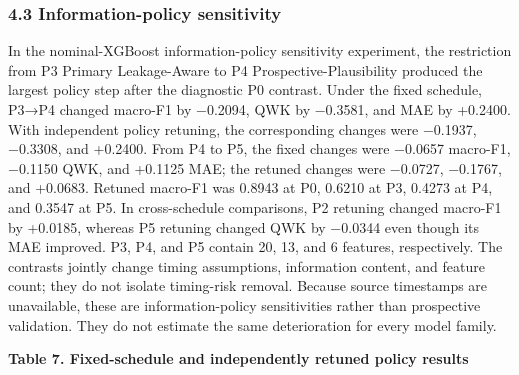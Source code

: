 \documentclass[
  a4paper,
  review]{elsarticle}
\begin{document}
\subsubsection{4.3 Information-policy
sensitivity}\label{information-policy-sensitivity}

In the nominal-XGBoost information-policy sensitivity experiment, the
restriction from P3 Primary Leakage-Aware to P4 Prospective-Plausibility
produced the largest policy step after the diagnostic P0 contrast. Under
the fixed schedule, P3→P4 changed macro-F1 by −0.2094, QWK by −0.3581,
and MAE by +0.2400. With independent policy retuning, the corresponding
changes were −0.1937, −0.3308, and +0.2400. From P4 to P5, the fixed
changes were −0.0657 macro-F1, −0.1150 QWK, and +0.1125 MAE; the retuned
changes were −0.0727, −0.1767, and +0.0683. Retuned macro-F1 was 0.8943
at P0, 0.6210 at P3, 0.4273 at P4, and 0.3547 at P5. In cross-schedule
comparisons, P2 retuning changed macro-F1 by +0.0185, whereas P5
retuning changed QWK by −0.0344 even though its MAE improved. P3, P4,
and P5 contain 20, 13, and 6 features, respectively. The contrasts
jointly change timing assumptions, information content, and feature
count; they do not isolate timing-risk removal. Because source
timestamps are unavailable, these are information-policy sensitivities
rather than prospective validation. They do not estimate the same
deterioration for every model family.

\textbf{Table 7. Fixed-schedule and independently retuned policy
results}
\end{document}
